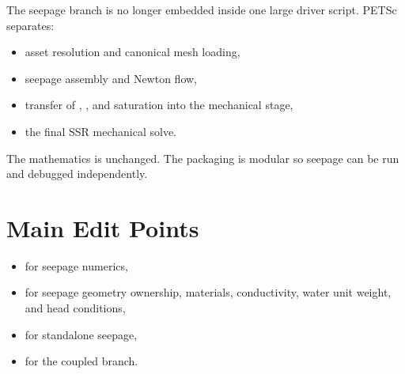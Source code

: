 The seepage branch is no longer embedded inside one large driver script. PETSc
separates:
\begin{itemize}
\item asset resolution and canonical mesh loading,
\item seepage assembly and Newton flow,
\item transfer of , , and saturation into the
mechanical stage,
\item the final SSR mechanical solve.
\end{itemize}

The mathematics is unchanged. The packaging is modular so seepage can be run
and debugged independently.

\section{Main Edit Points}

\begin{itemize}
\item {} for seepage numerics,
\item {} for seepage geometry ownership,
materials, conductivity, water unit weight, and head conditions,
\item {} for standalone
seepage,
\item {} for the
coupled branch.
\end{itemize}
